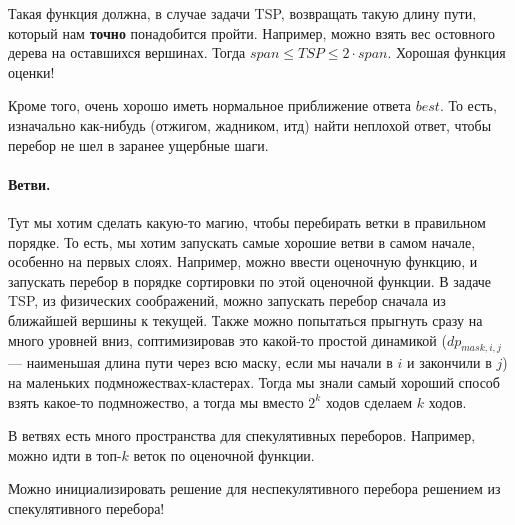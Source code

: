 \documentclass[12pt]{article}
\begin{document}
Такая функция должна, в случае задачи TSP, возвращать такую длину пути, который нам \textbf{точно} понадобится пройти. Например, можно взять вес остовного дерева на оставшихся вершинах. Тогда $span \le TSP \le 2 \cdot span$. Хорошая функция оценки!

Кроме того, очень хорошо иметь нормальное приближение ответа $best$. То есть, изначально как-нибудь (отжигом, жадником, итд) найти неплохой ответ, чтобы перебор не шел в заранее ущербные шаги.

\paragraph{Ветви.} Тут мы хотим сделать какую-то магию, чтобы перебирать ветки в правильном порядке. То есть, мы хотим запускать самые хорошие ветви в самом начале, особенно на первых слоях. Например, можно ввести оценочную функцию, и запускать перебор в порядке сортировки по этой оценочной функции. В задаче TSP, из физических соображений, можно запускать перебор сначала из ближайшей вершины к текущей. Также можно попытаться прыгнуть сразу на много уровней вниз, соптимизировав это какой-то простой динамикой ($dp_{mask, i, j}$ --- наименьшая длина пути через всю маску, если мы начали в $i$ и закончили в $j$) на маленьких подмножествах-кластерах. Тогда мы знали самый хороший способ взять какое-то подмножество, а тогда мы вместо $2^k$ ходов сделаем $k$ ходов. 

В ветвях есть много пространства для спекулятивных переборов. Например, можно идти в топ-$k$ веток по оценочной функции.

Можно инициализировать решение для неспекулятивного перебора решением из спекулятивного перебора!
\end{document}
